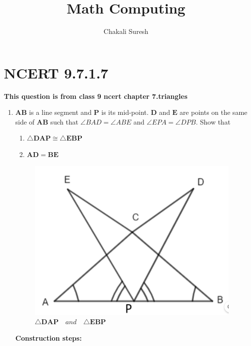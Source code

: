 \documentclass[11pt, a4paper]{article}
\title{ \textbf{Math Computing}}
\author{ Chakali Suresh }
\date{}
\let\vec\mathbf
\begin{document}
\vspace{-\baselineskip}
\maketitle

\section*{NCERT 9.7.1.7}

\textbf{This question is from class 9 ncert chapter 7.triangles}
\begin{enumerate}
	\item $\vec{AB}$ is a line segment and $\vec{P}$ is its mid-point. $\vec{D}$ and $\vec{E}$ are points on the same side of $\vec{AB}$ such that $\angle BAD = \angle ABE$ and $\angle EPA = \angle DPB$. Show that
		\begin{enumerate}
			\item $\triangle \vec{DAP} \cong  \triangle \vec{EBP}$
			\item $\vec{AD} = \vec{BE}$
\end{enumerate}
\begin{figure}[H]
    \includegraphics[width=\columnwidth]{figs/mc.png}
	\caption{$\triangle  \vec{DAP} \hspace{12pt} and \hspace{12pt} \triangle \vec{EBP}$}
 \label{fig:fig1}
\end{figure}
\pagebreak
\textbf{Construction steps:}
\\
		\begin{enumerate}[label=(\roman*)]


\end{enumerate}
\end{enumerate}
\end{document}
